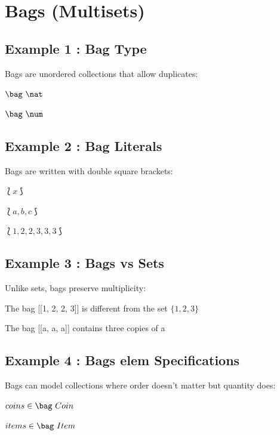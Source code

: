 \documentclass[a4paper,10pt,fleqn]{article}
\begin{document}
\section*{Bags (Multisets)}

\subsection*{Example 1 : Bag Type}

\noindent Bags are unordered collections that allow duplicates:

\bigskip

\noindent
$\bag~\nat$


\noindent
$\bag~\num$


\subsection*{Example 2 : Bag Literals}

\noindent Bags are written with double square brackets:

\bigskip

\noindent
$\lbag x \rbag$


\noindent
$\lbag a, b, c \rbag$


\noindent
$\lbag 1, 2, 2, 3, 3, 3 \rbag$


\subsection*{Example 3 : Bags vs Sets}

\noindent Unlike sets, bags preserve multiplicity:

\bigskip

\noindent The bag [[1, 2, 2, 3]] is different from the set $\{1, 2, 3\}$

\bigskip

\noindent The bag [[a, a, a]] contains three copies of a

\bigskip

\subsection*{Example 4 : Bags elem Specifications}

\noindent Bags can model collections where order doesn't matter but quantity does:

\bigskip

\noindent
$coins \in \bag~Coin$


\noindent
$items \in \bag~Item$
\end{document}
